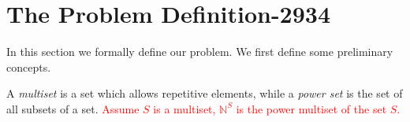 \section{The Problem Definition-2934}
\label{sec:prob-2934}

In this section we formally define our problem.
We first define some preliminary concepts.



A {\em multiset} is a set which allows repetitive elements, while a {\em
power set} is the set of all subsets of a set. \textcolor{red}{Assume $S$ is
a multiset, $\mathbb{N}^S$ is the power multiset of the set $S$.}

